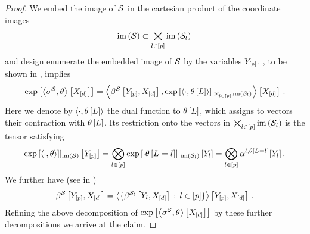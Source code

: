 \begin{proof}
    We embed the image of $\mathcal{S}$ in the cartesian product of the coordinate images  %
    \begin{align*}
        \mathrm{im}\left(\mathcal{S}\right) \subset \bigtimes_{l\in[p]} \mathrm{im}\left(\mathcal{S}_{l}\right) \,
    \end{align*}
    and design enumerate the embedded image of $\mathcal{S}$ by the variables $Y_{[p]}$.
    , to be shown in , implies
    \begin{align*}
        \mathrm{exp}\left[\left\langle \sigma^{\mathcal{S}},\theta\right\rangle \left[ X_{[d]} \right]\right]
        = \left\langle 
            \beta^{\mathcal{S}}\left[Y_{[p]},X_{[d]}\right],{\mathrm{exp}\left[\braket{\cdot,\theta\left[L\right]}\right]
            }|_{\bigtimes_{l\in[p]}\mathrm{im}\left(\mathcal{S}_{l}\right)}\right\rangle \left[ X_{[d]} \right] \, .
    \end{align*}
    Here we denote by $\braket{\cdot,\theta\left[L\right]}$ the dual function to $\theta\left[L\right]$, which assigns to vectors their contraction with $\theta\left[L\right]$.
    Its restriction onto the vectors in $\bigtimes_{l\in[p]}\mathrm{im}\left(\mathcal{S}_{l}\right)$ is the tensor satisfying
    \begin{align*}
        {\mathrm{exp}\left[\braket{\cdot,\theta}\right]}|_{\mathrm{im}\left(\mathcal{S}\right)}\left[Y_{[p]}\right]
        = \bigotimes_{l\in[p]} {\mathrm{exp}\left[\cdot \theta\left[L_{}=l_{}\right]\right]}|_{\mathrm{im}\left(\mathcal{S}_{l}\right)}\left[Y_{l}\right]
        = \bigotimes_{l\in[p]} \alpha^{l,\theta\left[L_{}=l_{}\right]}[Y_{l}] \, .
    \end{align*}
    We further have (see  in )
    \begin{align*}
        \beta^{\mathcal{S}}\left[Y_{[p]},X_{[d]}\right]
        = \left\langle \{\beta^{\mathcal{S}_{l}}\left[Y_{l},X_{[d]}\right] \, : \, l\in[p]\}\right\rangle \left[ Y_{[p]},X_{[d]} \right] \, .
    \end{align*}
    Refining the above decomposition of $\mathrm{exp}\left[\left\langle \sigma^{\mathcal{S}},\theta\right\rangle \left[ X_{[d]} \right]\right]$ by these further decompositions we arrive at the claim.
\end{proof}


